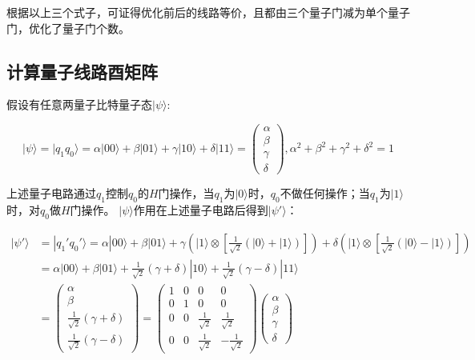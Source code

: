 \documentclass[12pt]{article}
\begin{document}
根据以上三个式子，可证得优化前后的线路等价，且都由三个量子门减为单个量子门，优化了量子门个数。

\subsection{计算量子线路酉矩阵}
假设有任意两量子比特量子态$|\psi\rangle$:

\[
|\psi\rangle = |q_1q_0\rangle = \alpha|00\rangle + \beta|01\rangle + \gamma|10\rangle + \delta|11\rangle = \begin{pmatrix} \alpha \\ \beta \\ \gamma \\ \delta \end{pmatrix}, \alpha^2+\beta^2+\gamma^2+\delta^2=1
\]

\begin{center}
\end{center}
    
上述量子电路通过$q_1$控制$q_0$的$H$门操作，当$q_1$为$|0\rangle$时，$q_0$不做任何操作；当$q_1$为$|1\rangle$时，对$q_0$做$H$门操作。
$|\psi\rangle$作用在上述量子电路后得到$|\psi'\rangle$：

\begin{align*}
    |\psi'\rangle &= |q_1'q_0'\rangle 
    = \alpha|00\rangle + \beta|01\rangle + 
    \gamma \left( |1\rangle \otimes \left[ \frac{1}{\sqrt{2}} \left( |0\rangle + |1\rangle \right) \right] \right)
    + \delta \left( |1\rangle \otimes \left[ \frac{1}{\sqrt{2}} \left( |0\rangle - |1\rangle \right) \right] \right) \\    
    &= \alpha|00\rangle + \beta|01\rangle + \frac{1}{\sqrt{2}}(\gamma+\delta)|10\rangle + \frac{1}{\sqrt{2}}(\gamma-\delta)|11\rangle \\
    &= \begin{pmatrix} \alpha \\ \beta \\ \frac{1}{\sqrt{2}}(\gamma+\delta) \\ \frac{1}{\sqrt{2}}(\gamma-\delta) \end{pmatrix}
    = \begin{pmatrix}1 & 0 & 0 & 0 \\ 0 & 1 & 0 & 0 \\ 0 & 0 & \frac{1}{\sqrt{2}} & \frac{1}{\sqrt{2}} \\ 0 & 0 & \frac{1}{\sqrt{2}} & -\frac{1}{\sqrt{2}}\end{pmatrix}
    \begin{pmatrix} \alpha \\ \beta \\ \gamma \\ \delta \end{pmatrix}
\end{align*}
\end{document}

